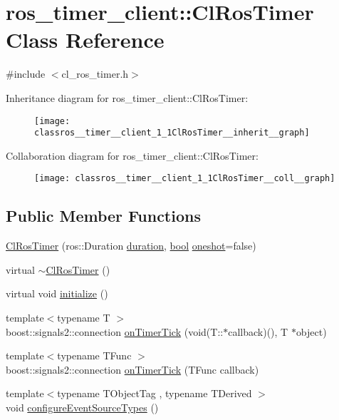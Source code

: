 \hypertarget{classros__timer__client_1_1ClRosTimer}{}\section{ros\+\_\+timer\+\_\+client\+:\+:Cl\+Ros\+Timer Class Reference}
\label{classros__timer__client_1_1ClRosTimer}


{\ttfamily \#include $<$cl\+\_\+ros\+\_\+timer.\+h$>$}



Inheritance diagram for ros\+\_\+timer\+\_\+client\+:\+:Cl\+Ros\+Timer\+:
\nopagebreak
\begin{figure}[H]
\begin{center}
\leavevmode
\texttt{[image: classros\_\_timer\_\_client\_1\_1ClRosTimer\_\_inherit\_\_graph]}
\end{center}
\end{figure}


Collaboration diagram for ros\+\_\+timer\+\_\+client\+:\+:Cl\+Ros\+Timer\+:
\nopagebreak
\begin{figure}[H]
\begin{center}
\leavevmode
\texttt{[image: classros\_\_timer\_\_client\_1\_1ClRosTimer\_\_coll\_\_graph]}
\end{center}
\end{figure}
\subsection*{Public Member Functions}
\begin{DoxyCompactItemize}
\item 
\hyperlink{classros__timer__client_1_1ClRosTimer_a7a8cde0adf8d957dc0fe20f38b6ae1bd}{Cl\+Ros\+Timer} (ros\+::\+Duration \hyperlink{classros__timer__client_1_1ClRosTimer_a79df7a52481e520ba959f3e6afb0a817}{duration}, \hyperlink{classbool}{bool} \hyperlink{classros__timer__client_1_1ClRosTimer_a767e8c7723206bd7a0a49f660418d628}{oneshot}=false)
\item 
virtual \hyperlink{classros__timer__client_1_1ClRosTimer_a099e3ba0adbd67092703bd5c776d6c3f}{$\sim$\+Cl\+Ros\+Timer} ()
\item 
virtual void \hyperlink{classros__timer__client_1_1ClRosTimer_a2d290d2a5d0afa7cdab543b17dbddbff}{initialize} ()
\item 
{\footnotesize template$<$typename T $>$ }\\boost\+::signals2\+::connection \hyperlink{classros__timer__client_1_1ClRosTimer_a06ecf6427b5df59f29879ab3bd1f120c}{on\+Timer\+Tick} (void(T\+::$\ast$callback)(), T $\ast$object)
\item 
{\footnotesize template$<$typename T\+Func $>$ }\\boost\+::signals2\+::connection \hyperlink{classros__timer__client_1_1ClRosTimer_a0ad81e975f7ea9f4b8e947663109c0eb}{on\+Timer\+Tick} (T\+Func callback)
\item 
{\footnotesize template$<$typename T\+Object\+Tag , typename T\+Derived $>$ }\\void \hyperlink{classros__timer__client_1_1ClRosTimer_aab7de28c1ae3d58090fd6031a9b5bc54}{configure\+Event\+Source\+Types} ()
\end{DoxyCompactItemize}
